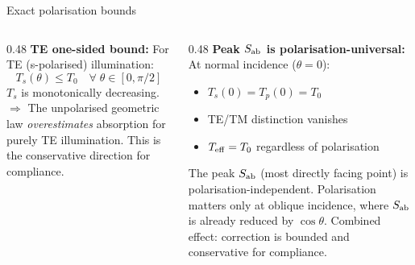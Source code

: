 \begin{frame}[label=app-p2-bounds]{Exact polarisation bounds}

  \begin{columns}[T]
    \begin{column}{0.48\textwidth}
      \textbf{TE one-sided bound:}
      \vspace{2pt}
      For TE (s-polarised) illumination:
      \[
        T_s(\theta) \le T_0 \quad \forall\;\theta \in [0, \pi/2]
      \]
      $T_s$ is monotonically decreasing.
      \vspace{2pt}
      $\Rightarrow$ The unpolarised geometric law \emph{overestimates} absorption for purely TE illumination.
      \vspace{2pt}
      This is the conservative direction for compliance.
    \end{column}

    \begin{column}{0.48\textwidth}
      \textbf{Peak $S_{\mathrm{ab}}$ is polarisation-universal:}
      \vspace{2pt}
      At normal incidence ($\theta = 0$):
      \begin{itemize}\setlength\itemsep{0pt}
        \item $T_s(0) = T_p(0) = T_0$
        \item TE/TM distinction vanishes
        \item $T_{\mathrm{eff}} = T_0$ regardless of polarisation
      \end{itemize}
      \vspace{1pt}
      The peak $S_{\mathrm{ab}}$ (most directly facing point) is polarisation-independent.
      \vspace{2pt}
      {\footnotesize Polarisation matters only at oblique incidence, where
       $S_{\mathrm{ab}}$ is already reduced by $\cos\theta$.
       Combined effect: correction is bounded
       and conservative for compliance.}
    \end{column}
  \end{columns}
  \vspace{-2pt}
\end{frame}

